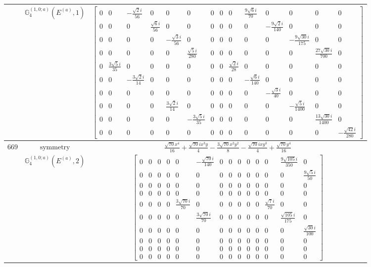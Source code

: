 \documentclass[fleqn,8pt,landscape]{jsarticle}
\begin{document}
\begin{longtable}{ccc}
$  $ & $ \mathbb{G}_{4}^{(1,0;a)}(E^{(a)},1) $ & $ \begin{bmatrix} 0 & 0 & - \frac{\sqrt{2} i}{56} & 0 & 0 & 0 & 0 & 0 & 0 & \frac{9 \sqrt{6} i}{70} & 0 & 0 & 0 & 0 \\ 0 & 0 & 0 & \frac{\sqrt{6} i}{56} & 0 & 0 & 0 & 0 & 0 & 0 & - \frac{9 \sqrt{2} i}{140} & 0 & 0 & 0 \\ 0 & 0 & 0 & 0 & - \frac{\sqrt{3} i}{56} & 0 & 0 & 0 & 0 & 0 & 0 & - \frac{9 \sqrt{30} i}{175} & 0 & 0 \\ 0 & 0 & 0 & 0 & 0 & \frac{\sqrt{5} i}{280} & 0 & 0 & 0 & 0 & 0 & 0 & \frac{27 \sqrt{30} i}{700} & 0 \\ 0 & \frac{3 \sqrt{5} i}{35} & 0 & 0 & 0 & 0 & 0 & 0 & \frac{\sqrt{2} i}{28} & 0 & 0 & 0 & 0 & 0 \\ 0 & 0 & - \frac{3 \sqrt{2} i}{14} & 0 & 0 & 0 & 0 & 0 & 0 & - \frac{\sqrt{6} i}{140} & 0 & 0 & 0 & 0 \\ 0 & 0 & 0 & 0 & 0 & 0 & 0 & 0 & 0 & 0 & - \frac{\sqrt{3} i}{40} & 0 & 0 & 0 \\ 0 & 0 & 0 & 0 & \frac{3 \sqrt{2} i}{14} & 0 & 0 & 0 & 0 & 0 & 0 & - \frac{\sqrt{5} i}{1400} & 0 & 0 \\ 0 & 0 & 0 & 0 & 0 & - \frac{3 \sqrt{5} i}{35} & 0 & 0 & 0 & 0 & 0 & 0 & \frac{13 \sqrt{30} i}{1400} & 0 \\ 0 & 0 & 0 & 0 & 0 & 0 & 0 & 0 & 0 & 0 & 0 & 0 & 0 & - \frac{\sqrt{42} i}{280} \end{bmatrix} $ \\ \hline
$ 669 $ & $ \text{symmetry} $ & $ \frac{\sqrt{70} x^{4}}{16} + \frac{\sqrt{70} i x^{3} y}{4} - \frac{3 \sqrt{70} x^{2} y^{2}}{8} - \frac{\sqrt{70} i x y^{3}}{4} + \frac{\sqrt{70} y^{4}}{16} $ \\
$  $ & $ \mathbb{G}_{4}^{(1,0;a)}(E^{(a)},2) $ & $ \begin{bmatrix} 0 & 0 & 0 & 0 & 0 & - \frac{\sqrt{70} i}{140} & 0 & 0 & 0 & 0 & 0 & 0 & \frac{9 \sqrt{105} i}{350} & 0 \\ 0 & 0 & 0 & 0 & 0 & 0 & 0 & 0 & 0 & 0 & 0 & 0 & 0 & \frac{9 \sqrt{5} i}{50} \\ 0 & 0 & 0 & 0 & 0 & 0 & 0 & 0 & 0 & 0 & 0 & 0 & 0 & 0 \\ 0 & 0 & 0 & 0 & 0 & 0 & 0 & 0 & 0 & 0 & 0 & 0 & 0 & 0 \\ 0 & 0 & 0 & 0 & \frac{3 \sqrt{70} i}{70} & 0 & 0 & 0 & 0 & 0 & 0 & \frac{\sqrt{7} i}{70} & 0 & 0 \\ 0 & 0 & 0 & 0 & 0 & \frac{3 \sqrt{70} i}{70} & 0 & 0 & 0 & 0 & 0 & 0 & \frac{\sqrt{105} i}{175} & 0 \\ 0 & 0 & 0 & 0 & 0 & 0 & 0 & 0 & 0 & 0 & 0 & 0 & 0 & \frac{\sqrt{30} i}{100} \\ 0 & 0 & 0 & 0 & 0 & 0 & 0 & 0 & 0 & 0 & 0 & 0 & 0 & 0 \\ 0 & 0 & 0 & 0 & 0 & 0 & 0 & 0 & 0 & 0 & 0 & 0 & 0 & 0 \\ 0 & 0 & 0 & 0 & 0 & 0 & 0 & 0 & 0 & 0 & 0 & 0 & 0 & 0 \end{bmatrix} $ \\ \hline

\end{longtable}
\end{document}
